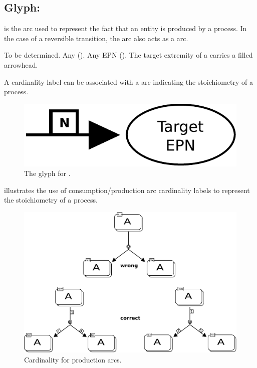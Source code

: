 

\subsection{Glyph: }\label{sec:production}

 is the arc used to represent the fact that an entity is 
produced by a process. In the case of a reversible transition, the 
 arc also acts as a  arc.

\begin{glyphDescription}
 \glyphSboTerm To be determined.
 \glyphOrigin Any  ().
 \glyphTarget Any EPN ().
 \glyphEndPoint The target extremity of a  carries a filled arrowhead.
 \end{glyphDescription}

A cardinality label can be associated with a  arc indicating the stoichiometry of a process.

\begin{figure}[H]
  \centering
  \includegraphics[scale = 0.4]{images/production}
  \caption{The \PD glyph for .}
  \label{fig:production}
\end{figure}

 illustrates the use of consumption/production arc cardinality labels to represent the stoichiometry of a process.

\begin{figure}[H]
  \centering
  \includegraphics[scale = 0.85]{examples/stoichEx1}
  \caption{Cardinality for production arcs.}
  \label{fig:prod-card}
\end{figure}





